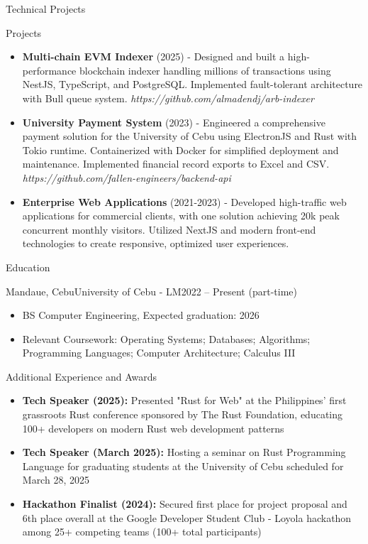 \documentclass[]{mcdowellcv}
\begin{document}
	\begin{cvsection}{Technical Projects}
		\begin{cvsubsection}{Projects}{}{}
			\begin{itemize}
				\item \textbf{Multi-chain EVM Indexer} (2025) - Designed and built a high-performance blockchain indexer handling millions of transactions using NestJS, TypeScript, and PostgreSQL. Implemented fault-tolerant architecture with Bull queue system. \textit{https://github.com/almadendj/arb-indexer}
				\item \textbf{University Payment System} (2023) - Engineered a comprehensive payment solution for the University of Cebu using ElectronJS and Rust with Tokio runtime. Containerized with Docker for simplified deployment and maintenance. Implemented financial record exports to Excel and CSV. \textit{https://github.com/fallen-engineers/backend-api}
				\item \textbf{Enterprise Web Applications} (2021-2023) - Developed high-traffic web applications for commercial clients, with one solution achieving 20k peak concurrent monthly visitors. Utilized NextJS and modern front-end technologies to create responsive, optimized user experiences.
			\end{itemize}
		\end{cvsubsection}
	\end{cvsection}
	
	\begin{cvsection}{Education}
		\begin{cvsubsection}{Mandaue, Cebu}{University of Cebu - LM}{2022 -- Present (part-time)}
			\begin{itemize}
				\item BS Computer Engineering, Expected graduation: 2026
				\item Relevant Coursework: Operating Systems; Databases; Algorithms; Programming Languages; Computer Architecture; Calculus III
			\end{itemize}
		\end{cvsubsection}
	\end{cvsection}
	
	\begin{cvsection}{Additional Experience and Awards}
		\begin{cvsubsection}{}{}{}	
			\begin{itemize}
				\item \textbf{Tech Speaker (2025):} Presented "Rust for Web" at the Philippines' first grassroots Rust conference sponsored by The Rust Foundation, educating 100+ developers on modern Rust web development patterns
				\item \textbf{Tech Speaker (March 2025): } Hosting a seminar on Rust Programming Language for graduating students at the University of Cebu scheduled for March 28, 2025
				\item \textbf{Hackathon Finalist (2024): } Secured first place for project proposal and 6th place overall at the Google Developer Student Club - Loyola hackathon among 25+ competing teams (100+ total participants)
			\end{itemize}
		\end{cvsubsection}
	\end{cvsection}
	
\end{document}
